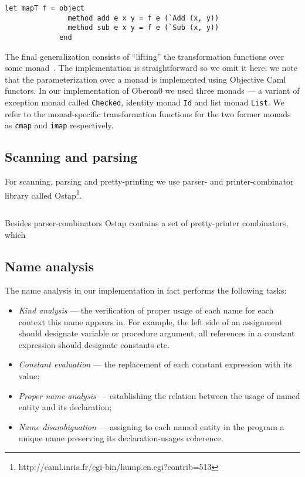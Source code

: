 \begin{lstlisting}
let mapT f = object
               method add e x y = f e (`Add (x, y))
               method sub e x y = f e (`Sub (x, y))
             end
\end{lstlisting}

The final generalization consists of ``lifting'' the transformation functions
over some monad~\cite{Monads}. The implementation is straightforward so we omit it
here; we note that the parameterization over a monad is implemented using Objective 
Caml functors. In our implementation of Oberon0 we used three monads --- a variant 
of exception monad called \lstinline{Checked}, identity monad \lstinline{Id} and list 
monad \lstinline{List}. We refer to the monad-specific transformation functions for 
the two former monads as \lstinline{cmap} and \lstinline{imap} respectively.

\subsection{Scanning and parsing}

For scanning, parsing and pretty-printing we use parser- and printer-combinator
library called Ostap\footnote{http://caml.inria.fr/cgi-bin/hump.en.cgi?contrib=513}. 




\begin{lstlisting}

\end{lstlisting}

Besides parser-combinators Ostap contains a set of pretty-printer combinators, which 

\subsection{Name analysis}

The name analysis in our implementation in fact performs the following tasks:

\begin{itemize}
\item \emph{Kind analysis} --- the verification of proper usage of each name for each context this
name appears in. For example, the left side of an assignment should designate variable or procedure argument,
all references in a constant expression should designate constants etc.
\item \emph{Constant evaluation} --- the replacement of each constant expression with
its value;
\item \emph{Proper name analysis} --- establishing the relation between the usage of
named entity and its declaration;
\item \emph{Name disambiguation} --- assigning to each named entity in the program a unique
name preserving its declaration-usages coherence.
\end{itemize}

